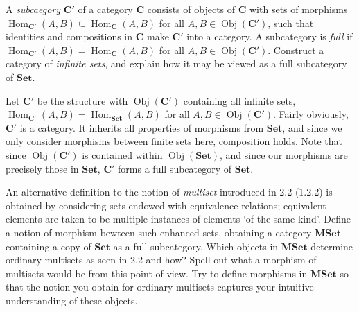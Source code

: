 \documentclass[11pt]{report}
\DeclareMathOperator{\Hom}{Hom}
\DeclareMathOperator{\Obj}{Obj}
\begin{document}
\begin{exercise}
	A \emph{subcaegory} $\mathbf{C}'$ of a category $\mathbf{C}$ consists of objects of $\mathbf{C}$ with sets of morphisms $\Hom_{ \mathbf{C}' }(A , B) \subseteq \Hom_{ \mathbf{C} }(A , B) $ for all $A,B\in \Obj( \mathbf{C}' ) $, such that identities and compositions in $\mathbf{C}$ make $\mathbf{C}'$ into a category. A subcategory is \emph{full} if $\Hom_{ \mathbf{C}' }(A , B) =\Hom_{ \mathbf{C} }(A , B) $ for all $A,B\in \Obj( \mathbf{C}' ) $. Construct a category of \emph{infinite sets}, and explain how it may be viewed as a full subcategory of $\mathbf{Set}$.
\end{exercise}
\begin{solution}
	Let $\mathbf{C}'$ be the structure with $\Obj( \mathbf{C}' ) $ containing all infinite sets, $\Hom_{ \mathbf{C}' }(A , B) =\Hom_{ \mathbf{Set} }(A , B) $ for all $A,B\in \Obj( \mathbf{C}' ) $. Fairly obviously, $\mathbf{C}'$ is a category. It inherits all properties of morphisms from $\mathbf{Set}$, and since we only consider morphisms between finite sets here, composition holds. Note that since $\Obj( \mathbf{C}' ) $ is contained within $\Obj( \mathbf{Set} ) $, and since our morphisms are precisely those in $\mathbf{Set}$, $\mathbf{C}'$ forms a full subcategory of $\mathbf{Set}$.
\end{solution}
\begin{exercise}
	An alternative definition to the notion of \emph{multiset} introduced in 2.2 (1.2.2) is obtained by considering sets endowed with equivalence relations; equivalent elements are taken to be multiple instances of elements `of the same kind'. Define a notion of morphism bewteen such enhanced sets, obtaining a category $\mathbf{MSet}$ containing a copy of $\mathbf{Set}$ as a full subcategory. Which objects in $\mathbf{MSet}$ determine ordinary multisets as seen in 2.2 and how? Spell out what a morphism of multisets would be from this point of view. Try to define morphisms in $\mathbf{MSet}$ so that the notion you obtain for ordinary multisets captures your intuitive understanding of these objects.
\end{exercise}
\end{document}
